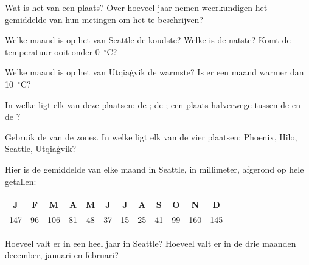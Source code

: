 \begin{exercise}[$\star$]\label{exo:g5:weather-and-climate:2}
Wat is het  van een plaats? Over hoeveel jaar nemen weerkundigen het
gemiddelde van hun metingen om het te beschrijven?
\end{exercise}

\begin{exercise}[$\star$]\label{exo:g5:weather-and-climate:3}
Welke maand is op het  van Seattle de koudste? Welke is de
natste? Komt de temperatuur ooit onder 0~$^\circ$C?
\end{exercise}

\begin{exercise}[$\star$]\label{exo:g5:weather-and-climate:4}
Welke maand is op het  van Utqiaġvik de warmste? Is er een
maand warmer dan 10~$^\circ$C?
\end{exercise}

\begin{exercise}[$\star$]\label{exo:g5:weather-and-climate:5}
In welke  ligt elk van deze plaatsen: de ; de ;
een plaats halverwege tussen de  en de ?
\end{exercise}

\begin{exercise}[$\star$]\label{exo:g5:weather-and-climate:6}
Gebruik de  van de zones. In welke  ligt elk van de vier
plaatsen: Phoenix, Hilo, Seattle, Utqiaġvik?
\end{exercise}

\begin{exercise}[$\star\star$]\label{exo:g5:weather-and-climate:7}
Hier is de gemiddelde  van elke maand in Seattle, in millimeter,
afgerond op hele getallen:
\begin{center}
\begin{tabular}{|*{12}{c|}}
\hline
J & F & M & A & M & J & J & A & S & O & N & D\\
\hline
147 & 96 & 106 & 81 & 48 & 37 & 15 & 25 & 41 & 99 & 160 & 145\\
\hline
\end{tabular}
\end{center}
Hoeveel  valt er in een heel jaar in Seattle? Hoeveel valt er in de
drie maanden december, januari en februari?
\end{exercise}

